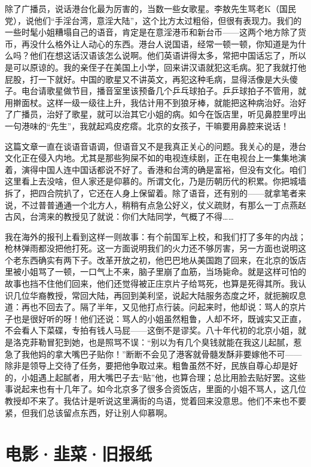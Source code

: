 除了广播员，说话港台化最为厉害的，当数一些女歌星。李敖先生骂老K（国民党），说他们“手淫台湾，意淫大陆”，这个比方太过粗俗，但很有表现力。我们的一些时髦小姐糟塌自己的语音，肯定是在意淫港币和新台币——这两个地方除了货币，再没什么格外让人动心的东西。港台人说国语，经常一顿一顿，你知道是为什么吗？他们在想这话汉语该怎么说啊。他们英语讲得太多，常把中国话忘了，所以是可以原谅的。我的亲侄子在美国上小学，回来讲汉语就犯这毛病。犯了我就打他屁股，打一下就好。中国的歌星又不讲英文，再犯这种毛病，显得活像是大头傻子。电台请歌星做节目，播音室里该预备几个乒乓球拍子。乒乒球拍子不管用，就用擀面杖。这样一级一级往上升，我估计用不到狼牙棒，就能把这种病治好。治好了广播员，治好了歌星，就可以治其它小姐的病。如今在饭店里，听见鼻腔里哼出一句港味的“先生”，我就起鸡皮疙瘩。北京的女孩子，干嘛要用鼻腔来说话！ 

这篇文章一直在谈语音语调，但语音又不是我真正关心的问题。我关心的是，港台文化正在侵入内地。尤其是那些狗屎不如的电视连续剧，正在电视台上一集集地演着，演得中国人连中国话都说不好了。香港和台湾的确是富裕，但没有文化。咱们这里看上去没啥，但人家还是仰慕的。所谓文化，乃是历朝历代的积累。你把城墙拆了，把四合院扒了，它还在人身上保留着。除了语音，还有别的——就拿笔者来说，不过普普通通一个北方人，稍稍有点急公好义，仗义疏财，有那么一丁点燕赵古风，台湾来的教授见了就说：你们大陆同学，气概了不得…… 

我在海外的报刊上看到这样一则故事：有个前国军上校，和我们打了多年的内战；枪林弹雨都没把他打死。这一方面说明我们的火力还不够厉害，另一方面也说明这个老东西确实有两下子。改革开放之初，他巴巴地从美国跑了回来，在北京的饭店里被小姐骂了一顿，一口气上不来，脑子里崩了血筋，当场毙命。就是这样可怕的故事也挡不住他们回来，他们还觉得被正庄京片子给骂死，也算是死得其所。我认识几位华裔教授，常回大陆，再回到美利坚，说起大陆服务态度之坏，就扼腕叹息道：再也不回去了。隔了半年，又见他打点行装。问起来时，他却说：骂人的京片子也是很好听的呀！他们还说：骂人的小姐虽然粗鲁，人却不坏，既诚实又正直，不会看人下菜碟，专拍有钱人马屁——这倒不是谬奖。八十年代初的北京小姐，就是洛克菲勒冒犯到她，也是照骂不误：“别以为有几个臭钱就能在我这儿起腻，惹急了我他妈的拿大嘴巴子贴你！”断断不会见了港客就骨髓发酥非要嫁他不可——除非是领导上交待了任务，要把他争取过来。粗鲁虽然不好，民族自尊心却是好的，小姐遇上起腻者，用大嘴巴子去“贴”他，也算合理；总比用脸去贴好罢。这些事说起来也有十几年了。如今北京多了很多合资饭店，里面的小姐不骂人，这几位教授却不来了。我估计是听说这里满街的鸟语，觉着回来没意思。他们不来也不要紧，但我们总该留点东西，好让别人仰慕啊。

\chapter{电影·韭菜·旧报纸}

